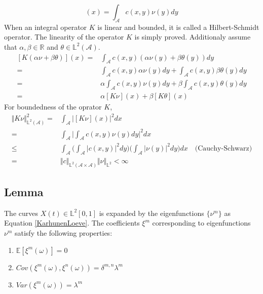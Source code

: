 \documentclass[11pt,twoside,a4paper]{article}
\begin{document}
	\begin{equation}
		[K\nu](x) = \int_{\mathcal{A}} c(x,y) \nu(y) dy
	\end{equation}
	When an integral operator $K$ is linear and bounded, it is called a Hilbert-Schmidt operator. The linearity of the operator $K$ is simply proved. Additionaly assume that $\alpha, \beta \in \mathbb{R}$ and $\theta \in \mathbb{L}^2(\mathcal{A})$.
	\begin{equation}
		\begin{split}
			[K (\alpha \nu + \beta \theta)](x) =& \int_{\mathcal{A}} c(x,y)(\alpha \nu(y) + \beta \theta(y)) dy\\
			= & \int_{\mathcal{A}} c(x,y) \alpha \nu(y) dy + \int_{\mathcal{A}} c(x,y) \beta \theta(y) dy\\
			= & \alpha\int_{\mathcal{A}} c(x,y) \nu (y) dy + \beta\int_{\mathcal{A}} c(x,y) \theta (y) dy\\
			= & \alpha[K\nu](x) + \beta[K\theta](x)
		\end{split}
	\end{equation}
	For boundedness of the oprator $K$,
	\begin{equation}
		\begin{split}
			\Vert K\nu \Vert^{2}_{\mathbb{L}^2(\mathcal{A})} = & \int_{\mathcal{A}} \biggl\vert [K\nu](x) \biggr\vert^2 dx\\
			= &\int_{\mathcal{A}} \biggl\vert \int_{\mathcal{A}}c(x,y)\nu(y)dy \biggr\vert^2dx\\
			\leq & \int_{\mathcal{A}}\biggl(\int_{\mathcal{A}}\vert c(x,y) \vert^2dy\biggr) \biggl(\int_{\mathcal{A}}\vert \nu(y) \vert ^2 dy \biggr)dx \quad \text{(Cauchy-Schwarz)}\\
			= & \Vert c \Vert_{\mathbb{L}^2(\mathcal{A} \times \mathcal{A})}\Vert \nu \Vert_{\mathbb{L}^2} < \infty
		\end{split}
	\end{equation}
	
	\subsection{Lemma} \label{Proof1}
	The curves $X(t) \in \mathbb{L}^2[0,1]$ is expanded by the eigenfunctions $\{\nu^m\}$ as Equation \ref{KarhunenLoeve}. The coefficients $\xi^{m}$ corresponding to eigenfunctions $\nu^m$ satisfy the following properties:
	
	\begin{multicols}{2}
		\begin{enumerate}
			\item $\mathbb{E}\left[\xi^m(\omega)\right] = 0$
			\item $Cov\left(\xi^m(\omega), \xi^n(\omega)\right) = \delta^{m,n}\lambda^m$%
			\item $Var\left(\xi^m(\omega)\right) = \lambda^m$
		\end{enumerate}
	\end{multicols}
\end{document}
